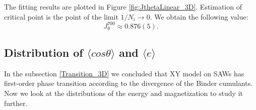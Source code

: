 The fitting results are plotted in Figure \ref{fig:JthetaLinear_3D}. Estimation of critical point is the point of the limit $1/N_i \rightarrow 0$. We obtain the following value: 
\begin{equation}
\label{eq:critical_J_theta_3D}
J_{\theta}^{700} \approx 0.876(5) .   
\end{equation}
 

\subsection{Distribution of $\langle cos \theta \rangle$ and $\langle e \rangle$ } \label{sec:distributions_3D}

In the subsection \ref{Transition_3D} we concluded that XY model on SAWs has first-order phase transition according to the divergence of the Binder cumulants. Now we look at the distributions of the energy and magnetization to study it further. 
 
